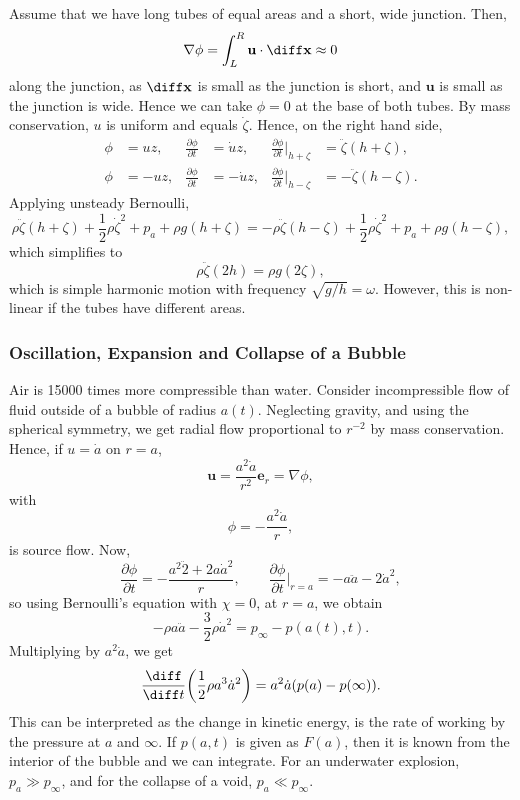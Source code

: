\documentclass[12pt]{article}
\begin{document}
Assume that we have long tubes of equal areas and a short, wide junction. Then,
\[
\nabla \phi = \int_{L}^{R} \mathbf{u} \cdot \diff \mathbf{x} \approx 0
\]
along the junction, as $\diff \mathbf{x}$ is small as the junction is short, and $\mathbf{u}$ is small as the junction is wide. Hence we can take $\phi = 0$ at the base of both tubes. By mass conservation, $u$ is uniform and equals $\dot \zeta$. Hence, on the right hand side,
\begin{align*}
	\phi &= uz, & \frac{\partial \phi}{\partial t} &= \dot u z, & \frac{\partial \phi}{\partial t} \biggr|_{h + \zeta} &= \ddot \zeta(h + \zeta), \\
	\phi &= -uz, & \frac{\partial \phi}{\partial t} &= - \dot uz, &\frac{\partial \phi}{\partial t} \biggr|_{h - \zeta} &= - \ddot \zeta(h - \zeta).
\end{align*}
Applying unsteady Bernoulli,
\[
\rho \ddot \zeta (h + \zeta) + \frac{1}{2} \rho \dot \zeta^2 + p_a + \rho g(h + \zeta) = - \rho \ddot \zeta (h - \zeta) + \frac{1}{2} \rho \dot \zeta^2 + p_a + \rho g(h - \zeta),
\]
which simplifies to
\[
\rho \ddot \zeta(2h) = \rho g(2 \zeta),
\]
which is simple harmonic motion with frequency $\sqrt{g/h} = \omega$. However, this is non-linear if the tubes have different areas.

\subsubsection{Oscillation, Expansion and Collapse of a Bubble}
\label{subsub:bubbles}

Air is \num{15000} times more compressible than water. Consider incompressible flow of fluid outside of a bubble of radius $a(t)$. Neglecting gravity, and using the spherical symmetry, we get radial flow proportional to $r^{-2}$ by mass conservation. Hence, if $u = \dot a$ on $r = a$,
\[
\mathbf{u} = \frac{a^2 \dot a}{r^2} \mathbf{e}_r = \nabla \phi,
\]
with
\[
\phi = - \frac{a^2 \dot a}{r},
\]
is source flow. Now,
\[
\frac{\partial \phi}{\partial t} = - \frac{a^2 \ddot 2 + 2 a \dot a ^2}{r}, \qquad \frac{\partial \phi}{\partial t}\biggr|_{r = a} = -a \ddot a - 2 \dot a^2,
\]
so using Bernoulli's equation with $\chi = 0$, at $r = a$, we obtain
\[
- \rho a \ddot a - \frac{3}{2} \rho \dot a^2 = p_{\infty} - p(a(t), t).
\]
Multiplying by $a^2 \dot a$, we get
\[
\frac{\diff}{\diff t} \biggl( \frac{1}{2} \rho a^3 \dot a^2 \biggr) = a^2 \dot a (p(a) - p(\infty)).
\]
This can be interpreted as the change in kinetic energy, is the rate of working by the pressure at $a$ and $\infty$. If $p(a, t)$ is given as $F(a)$, then it is known from the interior of the bubble and we can integrate. For an underwater explosion, $p_a \gg p_{\infty}$, and for the collapse of a void, $p_a \ll p_{\infty}$.
\end{document}
